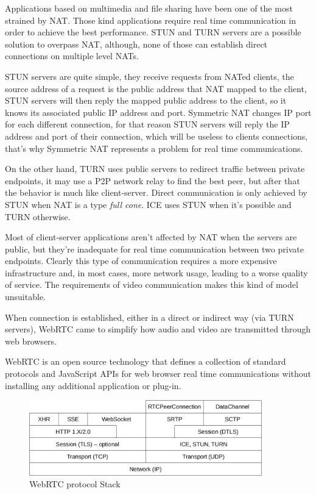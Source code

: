 Applications based on multimedia and file sharing have been one of the most strained by \ac{NAT}. Those kind applications require real time communication in order to achieve the best performance. \ac{STUN} and \ac{TURN} \cite{natvoip} servers are a possible solution to overpass \ac{NAT}, although, none of those can establish direct connections on multiple level \ac{NAT}s.

\ac{STUN} servers are quite simple, they receive requests from \ac{NAT}ed clients, the source address of a request is the public address that \ac{NAT} mapped to the client, \ac{STUN} servers will then reply the mapped public address to the client, so it knows its associated public \ac{IP} address and port. Symmetric \ac{NAT} changes \ac{IP} port for each different connection, for that reason \ac{STUN} servers will reply the \ac{IP} address and port of their connection, which will be useless to clients connections, that's why Symmetric \ac{NAT} represents a problem for real time communications.   

On the other hand, \ac{TURN} uses public servers to redirect traffic between private endpoints, it may use a \ac{P2P} network relay to find the best peer, but after that the behavior is much like client-server. Direct communication is only achieved by \ac{STUN} when \ac{NAT} is a type \textit{full cone}. \ac{ICE} uses \ac{STUN} when it's possible and \ac{TURN} otherwise.

Most of client-server applications aren't affected by \ac{NAT} when the servers are public, but they're inadequate for real time communication between two private endpoints. Clearly this type of communication requires a more expensive infrastructure and, in most cases, more network usage, leading to a worse quality of service. The requirements of video communication makes this kind of model unsuitable.

When connection is established, either in a direct or indirect way (via \ac{TURN} servers), \ac{WebRTC} came to simplify how audio and video are transmitted through web browsers.

\ac{WebRTC} is an open source technology that defines a collection of standard protocols and JavaScript \ac{API}s for web browser real time communications without installing any additional application or plug-in.

\begin{figure}[H]
	\begin{center}
		\centering
		\includegraphics[width=0.9\textwidth]{figures/webrtc_stack.png}

	\caption{WebRTC protocol Stack}
	\end{center}
\end{figure}

